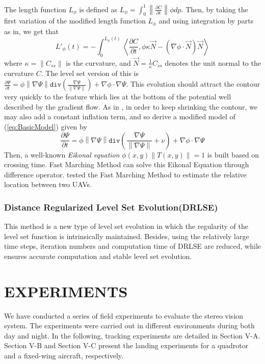\documentclass[letterpaper, 10 pt, conference]{ieeeconf}  %
\begin{document}
The length function $L_\phi $  is defined as $ L_\phi = \int_{0}^{1}  \left\| \frac{\partial C}{\partial t}  \right\| \phi dp$. Then, by taking the first variation of the modified length function $L_\phi $  and using integration by parts as in, we get that 
\begin{equation}  L'_\phi(t) = - \int_{0}^{L_\phi(t)} \left\langle \frac{\partial C}{\partial t}, \phi \kappa \vec{N} - ( \nabla \phi \cdot \vec{N})\vec{N}   \right\rangle\end{equation}
where $ \kappa = \left\| C_{ss}  \right\| $  is the curvature, and $ \vec{N} = \frac{1}{\kappa}  C_{ss}$ denotes the unit normal to the curvature  $C$. The level set version of this is $ \frac{\partial \Psi}{\partial t}   =   \phi \left\|\nabla\Psi\right\|  \texttt{div}(\frac{\nabla \Psi}{\left\|\nabla\Psi\right\|})  + \nabla \phi \cdot \nabla \Psi$. This evolution should attract the contour very quickly to the feature which lies at the bottom of the potential well described by the gradient flow. As in \cite{sethian1985curvature}\cite{osher1988fronts}, in order to keep shrinking the contour, we may also add a constant inflation term, and so derive a modified model of (\ref{eq:BasicModel}) given by
\begin{equation}  \frac{\partial \Psi}{\partial t}   =   \phi \left\|\nabla\Psi\right\|  \texttt{div}(\frac{\nabla \Psi}{\left\|\nabla\Psi\right\|} + \nu)  + \nabla \phi \cdot \nabla \Psi\end{equation}
Then, a well-known {\it Eikonal equation} $\phi(x,y)\left\|T(x,y)\right\| = 1$  is built based on crossing time. Fast Marching Method can solve this Eikonal Equation through difference operator. \cite{johnson2007real} tested the Fast Marching Method to estimate the relative location between two UAVs.  
\subsubsection{Distance Regularized Level Set Evolution(DRLSE)\cite{Li2010}}
This method is a new type of level set evolution in which the regularity of the level set function is intrinsically maintained. Besides, using the relatively large time steps, iteration numbers and computation time of DRLSE are reduced, while ensures accurate computation and stable level set evolution.

   
\section{EXPERIMENTS}
We have conducted a series of field experiments to evaluate the stereo vision system. The experiments were carried out in different environments during both day and night. In the following, tracking experiments are detailed in Section V-A. Section V-B and Section V-C present the landing experiments for a quadrotor and a fixed-wing aircraft, respectively.
\end{document}
